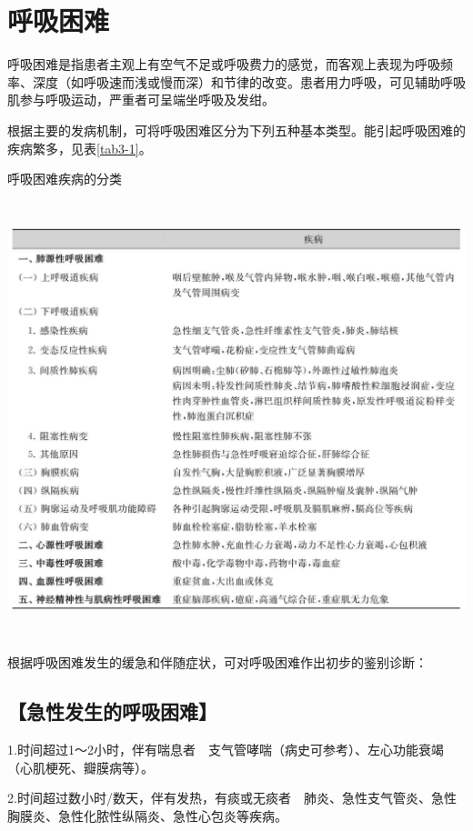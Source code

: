 \chapter{呼吸困难}

呼吸困难是指患者主观上有空气不足或呼吸费力的感觉，而客观上表现为呼吸频率、深度（如呼吸速而浅或慢而深）和节律的改变。患者用力呼吸，可见辅助呼吸肌参与呼吸运动，严重者可呈端坐呼吸及发绀。

根据主要的发病机制，可将呼吸困难区分为下列五种基本类型。能引起呼吸困难的疾病繁多，见表\ref{tab3-1}。

\begin{table}[htbp]
\centering
\caption{呼吸困难疾病的分类}
\label{tab3-1}
\includegraphics[width=5.95833in,height=5in]{./images/Image00032.jpg}
\end{table}

根据呼吸困难发生的缓急和伴随症状，可对呼吸困难作出初步的鉴别诊断：

\section{【急性发生的呼吸困难】}

1.时间超过1～2小时，伴有喘息者　支气管哮喘（病史可参考）、左心功能衰竭（心肌梗死、瓣膜病等）。

2.时间超过数小时/数天，伴有发热，有痰或无痰者　肺炎、急性支气管炎、急性胸膜炎、急性化脓性纵隔炎、急性心包炎等疾病。

